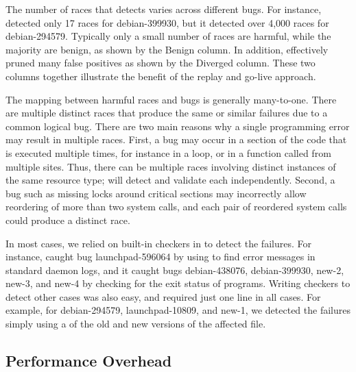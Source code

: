 The number of races that \racepro detects varies across different bugs.
For instance, \racepro detected only 17 races for debian-399930, but it
detected over 4,000 races for debian-294579.  Typically only a small
number of races are harmful, while the majority are
benign, as shown by the Benign column.  In addition, \racepro effectively
pruned many false positives as shown by the Diverged column.  
These two columns together illustrate the benefit of the replay and
go-live approach.

The mapping between harmful races and bugs is generally many-to-one.
There are multiple distinct races that produce the same or similar
failures due to a common logical bug. There are two main reasons why a
single programming error may result in multiple races. First, a bug
may occur in a section of the code that is executed multiple times,
for instance in a loop, or in a function called from multiple sites.
Thus, there can be multiple races involving distinct instances of the
same resource type; \racepro will detect and validate each independently.
Second, a bug such as missing locks around critical sections may
incorrectly allow reordering of more than two system calls, and each
pair of reordered system calls could produce a distinct race.

In most cases, we relied on built-in checkers in \racepro to detect the
failures. For instance, \racepro caught bug launchpad-596064 by using
 to find error messages in standard daemon logs, and it caught
bugs debian-438076, debian-399930, new-2, new-3, and new-4 by checking
for the exit status of programs.  Writing checkers to detect other
cases was also easy, and required just one line in all cases. For
example, for debian-294579, launchpad-10809, and new-1, we detected
the failures simply using a  of the old and new versions of
the affected file.

\subsection{Performance Overhead} 

